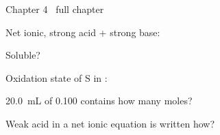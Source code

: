 \documentclass{apchem-worksheet}
\begin{document}
\begin{spiralstrip}{Chapter 4 \textbullet\ full chapter}
  \item Net ionic, strong acid + strong base:
  \item Soluble?  
  \item Oxidation state of S in : 
  \item \SI{20.0}{\milli\liter} of \SI{0.100}{\Molar}  contains how
        many moles? 
  \item Weak acid in a net ionic equation is written how?
\end{spiralstrip}
\end{document}
